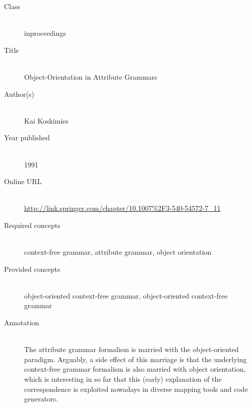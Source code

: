 \begin{description}
\item[Class]\mbox{}\\
inproceedings
\item[Title]\mbox{}\\
Object-Orientation in Attribute Grammars
\item[Author(s)]\mbox{}\\
Kai Koskimies\item[Year published]\mbox{}\\
1991
\item[Online URL]\mbox{}\\
{\footnotesize\url{http://link.springer.com/chapter/10.1007%2F3-540-54572-7_11}}
\item[Required concepts]\mbox{}\\
context-free grammar, attribute grammar, object orientation\item[Provided concepts]\mbox{}\\
object-oriented context-free grammar, object-oriented context-free grammar\item[Annotation]\mbox{}\\
The attribute grammar formalism is married with the object-oriented paradigm. Arguably, a side effect of this marriage is that the underlying context-free grammar formalism is also married with object orientation, which is interesting in so far that this (early) explanation of the correspondence is exploited nowadays in diverse mapping tools and code generators.
\end{description}

